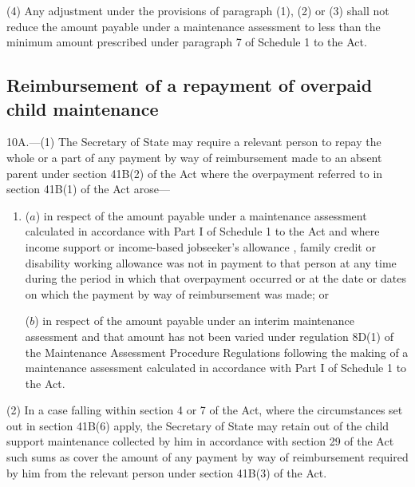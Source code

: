 \documentclass[12pt,a4paper]{article}
\begin{document}
(4) Any adjustment under the provisions of paragraph (1), (2) or (3) shall not reduce the amount payable under a maintenance assessment to less than the minimum amount prescribed under paragraph 7 of Schedule 1 to the Act.



\subsection[10A. Reimbursement of a repayment of overpaid child maintenance]{Reimbursement of a repayment of overpaid child maintenance}

10A.—(1) The Secretary of State may require a relevant person to repay the whole or a part of any payment by way of reimbursement made to an absent parent under section 41B(2) of the Act where the overpayment referred to in section 41B(1) of the Act arose—
\begin{enumerate}\item[]
($a$) in respect of the amount payable under a maintenance assessment calculated in accordance with Part I of Schedule 1 to the Act and where income support
or income-based jobseeker’s allowance%
, family credit or disability working allowance was not in payment to that person at any time during the period in which that overpayment occurred or at the date or dates on which the payment by way of reimbursement was made; or

($b$) in respect of the amount payable under an interim maintenance assessment and that amount has not been varied under regulation 8D(1) of the Maintenance Assessment Procedure Regulations following the making of a maintenance assessment calculated in accordance with Part I of Schedule 1 to the Act.
\end{enumerate}

(2) In a case falling within section 4 or 7 of the Act, where the circumstances set out in section 41B(6) apply, the Secretary of State may retain out of the child support maintenance collected by him in accordance with section 29 of the Act such sums as cover the amount of any payment by way of reimbursement required by him from the relevant person under section 41B(3) of the Act.
\end{document}

